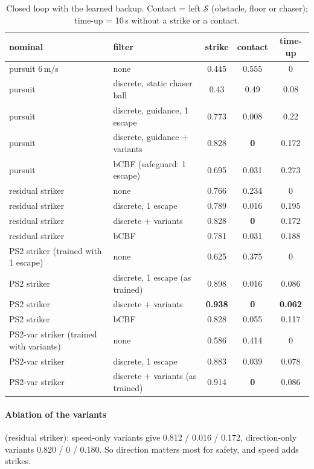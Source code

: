 \documentclass[11pt]{article}
\newcommand{\Safe}{\mathcal{S}}
\begin{document}
\begin{table}[h]\centering\small
\caption{Closed loop with the learned backup. Contact = left $\Safe$ (obstacle, floor or chaser); time-up = 10\,s without a strike or a contact.}\label{tab:main}
\begin{tabular}{llccc}\toprule
nominal & filter & strike & contact & time-up\\\midrule
pursuit 6\,m/s & none & 0.445 & 0.555 & 0\\
pursuit & discrete, static chaser ball & 0.43 & 0.49 & 0.08\\
pursuit & discrete, guidance, 1 escape & 0.773 & 0.008 & 0.22\\
pursuit & discrete, guidance + variants & 0.828 & \textbf{0} & 0.172\\
pursuit & bCBF (safeguard: 1 escape) & 0.695 & 0.031 & 0.273\\\midrule
residual striker & none & 0.766 & 0.234 & 0\\
residual striker & discrete, 1 escape & 0.789 & 0.016 & 0.195\\
residual striker & discrete + variants & 0.828 & \textbf{0} & 0.172\\
residual striker & bCBF & 0.781 & 0.031 & 0.188\\\midrule
PS2 striker (trained with 1 escape) & none & 0.625 & 0.375 & 0\\
PS2 striker & discrete, 1 escape (as trained) & 0.898 & 0.016 & 0.086\\
PS2 striker & discrete + variants & \textbf{0.938} & \textbf{0} & \textbf{0.062}\\
PS2 striker & bCBF & 0.828 & 0.055 & 0.117\\\midrule
PS2-var striker (trained with variants) & none & 0.586 & 0.414 & 0\\
PS2-var striker & discrete, 1 escape & 0.883 & 0.039 & 0.078\\
PS2-var striker & discrete + variants (as trained) & 0.914 & \textbf{0} & 0.086\\\bottomrule
\end{tabular}
\end{table}

\paragraph{Ablation of the variants} (residual striker): speed-only variants give 0.812 / 0.016 / 0.172, direction-only variants 0.820 / 0 / 0.180.
So direction matters most for safety, and speed adds strikes.
\end{document}
